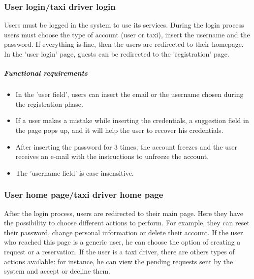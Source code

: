 \subsubsection{User login/taxi driver login}
Users must be logged in the system to use its services.
During the login process users must choose the type of account (user or taxi), insert the username and the password. If everything is fine, then the users are redirected to their homepage.
In the 'user login' page, guests can be redirected to the 'registration' page.

	\subparagraph{Functional requirements}
	\noindent
		\begin{itemize}
			\item In the 'user field', users can insert the email or the username chosen during the registration phase.
			\item If a user makes a mistake while inserting the credentials, a suggestion field in the page pops up, and it will help the user to recover his credentials.
			\item After inserting the password for 3 times, the account freezes and the user receives an e-mail with the instructions to unfreeze the account.
			\item The 'username field' is case insensitive.
			
		\end{itemize}

\subsubsection{User home page/taxi driver home page}  
After the login process, users are redirected to their main page. Here they have the possibility to choose different actions to perform.
For example, they can reset their password, change personal information or delete their account.
If the user who reached this page is a generic user, he can choose the option of creating a request or a reservation.
If the user is a taxi driver, there are others types of actions available: for instance, he can view the pending requests sent by the system and accept or decline them.

